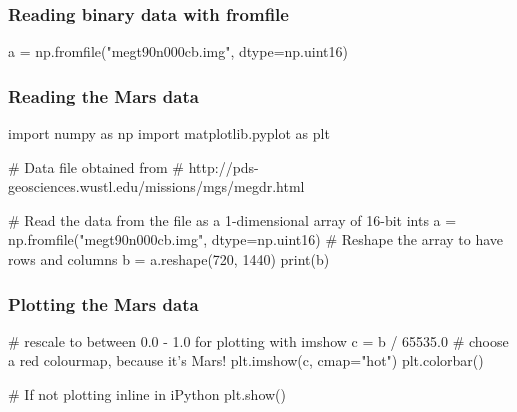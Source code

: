 \documentclass{beamer}
\begin{document}
\begin{frame}[fragile]
\frametitle{Reading binary data with fromfile}
\begin{code}
a = np.fromfile("megt90n000cb.img", dtype=np.uint16)
\end{code}
\end{frame}

\begin{frame}[fragile]
\frametitle{Reading the Mars data}
\begin{code}
import numpy as np
import matplotlib.pyplot as plt

# Data file obtained from 
# http://pds-geosciences.wustl.edu/missions/mgs/megdr.html

# Read the data from the file as a 1-dimensional array of 16-bit ints
a = np.fromfile("megt90n000cb.img", dtype=np.uint16)
# Reshape the array to have rows and columns
b = a.reshape(720, 1440)
print(b)
\end{code}
\end{frame}


\begin{frame}[fragile]
\frametitle{Plotting the Mars data}
\begin{code}
# rescale to between 0.0 - 1.0 for plotting with imshow
c = b / 65535.0
# choose a red colourmap, because it's Mars!
plt.imshow(c, cmap="hot")
plt.colorbar()

# If not plotting inline in iPython
plt.show()
\end{code}
\end{frame}





\end{document}
